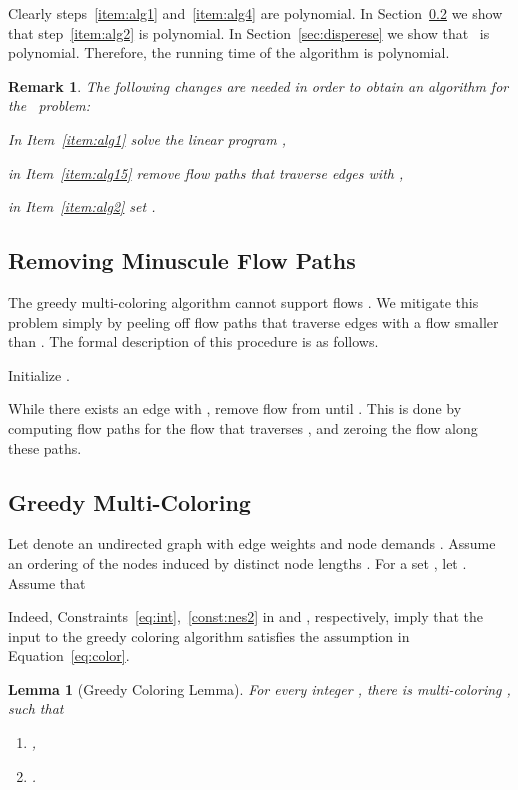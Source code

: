 \documentclass[11pt]{article}
\newenvironment{proof sketch}{\noindent {\bf Proof sketch:} }{\hfill \qed}
\newtheorem{lemma}{Lemma}
\newtheorem{rem}{Remark}
\newcommand{\disperse}{\text{\emph{disperse}}}
\newcommand{\MAXMIN}{\text{\sc{Max-Min Throughput}}}
\begin{document}
Clearly steps~\ref{item:alg1} and~\ref{item:alg4} are polynomial.
In Section~\ref{sec:coloring} we show that step~\ref{item:alg2} is polynomial.
In Section~\ref{sec:disperese} we show that \disperse\ is polynomial.
Therefore, the running time of the algorithm is polynomial.

\begin{rem}
    The following changes are needed in order to obtain an algorithm for the \MAXMIN\ problem:
    \begin{inparaenum}[(i)]
        \item In Item~\ref{item:alg1} solve the linear program ,
        \item in Item~\ref{item:alg15} remove flow paths that traverse edges
            with ,
        \item in Item~\ref{item:alg2} set .
    \end{inparaenum}
\end{rem}

\subsection{Removing Minuscule Flow Paths}\label{sec:remove}

The greedy multi-coloring algorithm cannot support flows .  We mitigate this problem simply by peeling off flow
paths that traverse edges with a flow smaller than .  The
formal description of this procedure is as follows.
\begin{inparaenum}[(1)]
\item Initialize .
\item While there exists an edge  with ,
  remove flow from  until .  This is done by
  computing flow paths for the flow that traverses , and zeroing
  the flow along these paths.
\end{inparaenum}


\subsection{Greedy Multi-Coloring}\label{sec:coloring}
Let  denote an undirected graph with edge weights  and node demands .  Assume
an ordering of the nodes induced by distinct node lengths . For a set , let .
Assume that


Indeed, Constraints~\ref{eq:int},~\ref{const:nes2} in  and ,  respectively, imply that the input to the greedy coloring algorithm satisfies the assumption in Equation~\ref{eq:color}.

\begin{lemma}[Greedy Coloring Lemma] \label{lemma:color}
For every integer , there is
  multi-coloring , such that
  \begin{enumerate}
  \item , \label{item:color1}
  \item .
  \end{enumerate}
\end{lemma}
\end{document}
